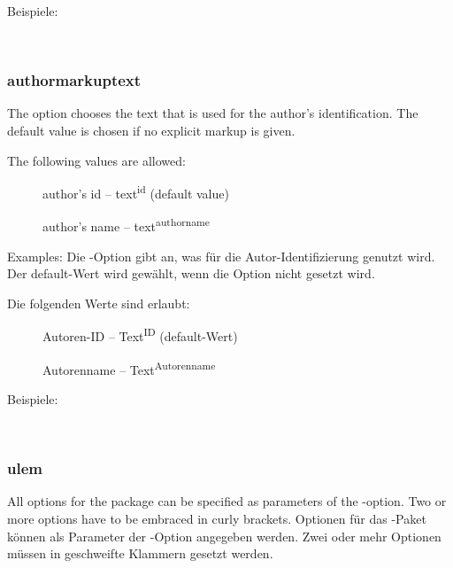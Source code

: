 	Beispiele:
\fi

\\

\subsubsection{authormarkuptext}
\ifENGLISH
The  option chooses the text that is used for the author's identification.
The default value is chosen if no explicit markup is given.

The following values are allowed:
\begin{description}
	\item [] author's id -- text\textsuperscript{id} (default value)
	\item [] author's name -- text\textsuperscript{authorname}
\end{description}

Examples:
\fi
\ifGERMAN
	Die -Option gibt an, was für die Autor-Identifizierung genutzt wird.
	Der default-Wert wird gewählt, wenn die Option nicht gesetzt wird.

	Die folgenden Werte sind erlaubt:
	\begin{description}
		\item [] Autoren-ID -- Text\textsuperscript{ID} (default-Wert)
		\item [] Autorenname -- Text\textsuperscript{Autorenname}
	\end{description}

	Beispiele:
\fi

\\

\subsubsection{ulem}
\ifENGLISH
All options for the  package can be specified as parameters of the -option.
Two or more options have to be embraced in curly brackets.
\fi
\ifGERMAN
	Optionen für das -Paket können als Parameter der -Option angegeben werden.
	Zwei oder mehr Optionen müssen in geschweifte Klammern gesetzt werden.
\fi

